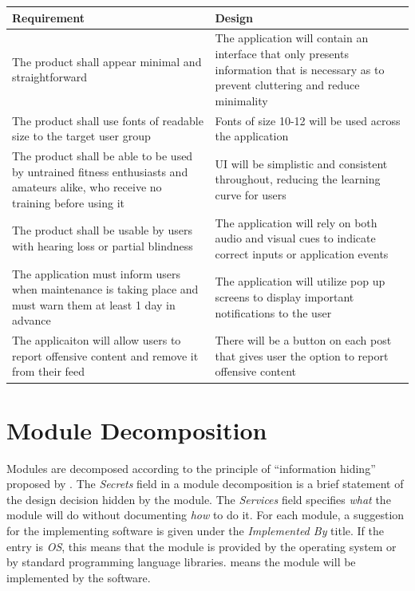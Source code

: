 \documentclass[12pt, titlepage]{article}
\begin{document}
\begin{tabular}{ | m{20em} | m{20em} | } 
  \hline
  Requirement & Design \\
  \hline
  The product shall appear minimal and straightforward & The application will contain an interface that only presents information that is necessary as to prevent cluttering and reduce minimality \\
  \hline
  The product shall use fonts of readable size to the target user group & Fonts of size 10-12 will be used across the application \\
  \hline
  The product shall be able to be used by untrained fitness enthusiasts and amateurs alike, who receive no training before using it & UI will be simplistic and consistent throughout, reducing the learning curve for users \\
  \hline
  The product shall be usable by users with hearing loss or partial blindness & The application will rely on both audio and visual cues to indicate correct inputs or application events \\
  \hline
  The application must inform users when maintenance is taking place and must warn them at least 1 day in advance & The application will utilize pop up screens to display important notifications to the user \\
  \hline
  The applicaiton will allow users to report offensive content and remove it from their feed & There will be a button on each post that gives user the option to report offensive content \\
  \hline

\end{tabular}

\section{Module Decomposition} \label{SecMD}

Modules are decomposed according to the principle of ``information hiding''
proposed by \citet{ParnasEtAl1984}. The \emph{Secrets} field in a module
decomposition is a brief statement of the design decision hidden by the
module. The \emph{Services} field specifies \emph{what} the module will do
without documenting \emph{how} to do it. For each module, a suggestion for the
implementing software is given under the \emph{Implemented By} title. If the
entry is \emph{OS}, this means that the module is provided by the operating
system or by standard programming language libraries.  \emph{\progname{}} means the
module will be implemented by the \progname{} software.
\end{document}
